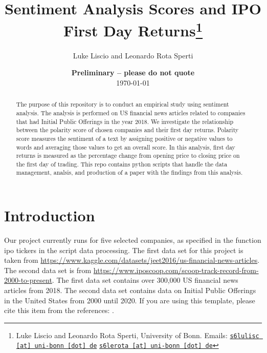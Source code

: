 \documentclass[11pt, a4paper, leqno]{article}
\begin{document}
\title{Sentiment Analysis Scores and IPO First Day Returns\thanks{Luke Liscio and Leonardo Rota Sperti, University of Bonn. Emails: \href{mailto:s6lulisc@uni-bonn.de}{\nolinkurl{s6lulisc [at] uni-bonn [dot] de}} \href{mailto:s6lerota@uni-bonn.de}{\nolinkurl{s6lerota [at] uni-bonn [dot] de}}}}

\author{Luke Liscio and Leonardo Rota Sperti}

\date{
    {\bf Preliminary -- please do not quote}
    \\[1ex]
    \today
}

\maketitle


\begin{abstract}
    The purpose of this repository is to conduct an empirical study using sentiment analysis.
The analysis is performed on US financial news articles related to companies that had Initial Public Offerings in the year 2018.
We investigate the relationship between the polarity score of chosen companies and their first day returns.
Polarity score measures the sentiment of a text by assigning positive or negative values to words and averaging those values to get an overall score.
In this analysis, first day returns is measured as the percentage change from opening price to closing price on the first day of trading.
This repo contains python scripts that handle the data management, analsis, and production of a paper with the findings from this analysis.
\end{abstract}

\clearpage


\section{Introduction} %
\label{sec:introduction}

Our project currently runs for five selected companies, as specified in the function ipo tickers in the script data processing.
The first data set for this project is taken from
\url{https://www.kaggle.com/datasets/jeet2016/us-financial-news-articles}.
The second data set is from
\url{https://www.iposcoop.com/scoop-track-record-from-2000-to-present}.
The first data set contains over 300,000 US financial news articles from 2018.
The second data set contains data on Initial Public Offerings in the United States from 2000 until 2020.
If you are using this template, please cite this item from the references:
\citet{GaudeckerEconProjectTemplates}.
\end{document}

